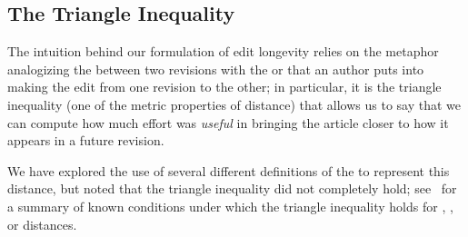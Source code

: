 \subsection{The Triangle Inequality}
\label{sec:triangle-inequality}

The intuition behind our formulation of edit longevity relies on
the metaphor analogizing the  between two revisions
with the  or  that an author puts
into making the edit from one revision to the other;
in particular, it is the triangle inequality (one of the
metric properties of distance) that allows us to say that we
can compute how much effort was \textit{useful} in bringing
the article closer to how it appears in a future revision.

We have explored the use of several different definitions of
the  to represent this distance, but
noted that the triangle inequality did not completely hold;
see~\cite{Sankoff1999} for a summary of known conditions under which
the triangle inequality holds for
, , or  distances.

